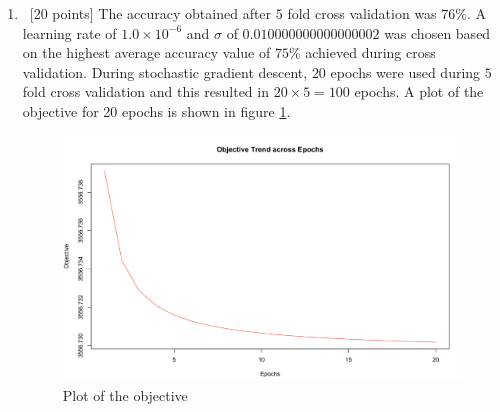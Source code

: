 \begin{enumerate}
\item ~[20 points] The accuracy obtained after $5$ fold cross validation was $76\%$. A learning rate of $1.0 \times 10^{-6}$ and $\sigma$ of $0.010000000000000002$ was chosen based on the highest average accuracy value of $75\%$ achieved during cross validation. During stochastic gradient descent, $20$ epochs were used during $5$ fold cross validation and this resulted in $20 \times 5 = 100$ epochs. A plot of the objective for 20 epochs is shown in figure \ref{logl}.

\begin{figure}[!t]
\centering
\includegraphics[width=5.5in]{ObjectiveTrend.png}
\caption{Plot of the objective}
\label{logl}
\end{figure}

\end{enumerate}




